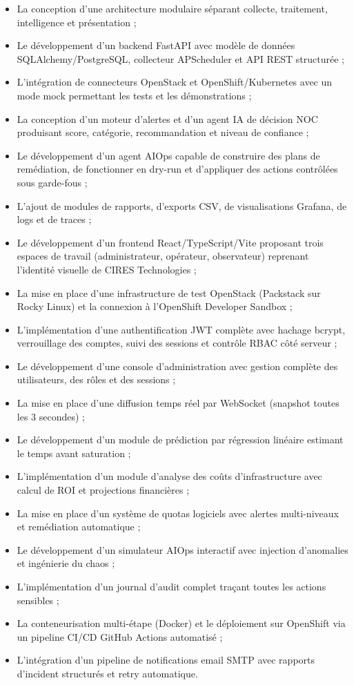 \documentclass[11pt,a4paper]{report}
\begin{document}
\begin{itemize}
  \item La conception d'une architecture modulaire séparant collecte,
    traitement, intelligence et présentation ;
  \item Le développement d'un backend FastAPI avec modèle de données
    SQLAlchemy/PostgreSQL, collecteur APScheduler et API REST structurée ;
  \item L'intégration de connecteurs OpenStack et OpenShift/Kubernetes avec
    un mode mock permettant les tests et les démonstrations ;
  \item La conception d'un moteur d'alertes et d'un agent IA de décision NOC
    produisant score, catégorie, recommandation et niveau de confiance ;
  \item Le développement d'un agent AIOps capable de construire des plans de
    remédiation, de fonctionner en dry-run et d'appliquer des actions
    contrôlées sous garde-fous ;
  \item L'ajout de modules de rapports, d'exports CSV, de visualisations
    Grafana, de logs et de traces ;
  \item Le développement d'un frontend React/TypeScript/Vite proposant trois
    espaces de travail (administrateur, opérateur, observateur) reprenant
    l'identité visuelle de CIRES Technologies ;
  \item La mise en place d'une infrastructure de test OpenStack (Packstack
    sur Rocky Linux) et la connexion à l'OpenShift Developer Sandbox ;
  \item L'implémentation d'une authentification JWT complète avec hachage
    bcrypt, verrouillage des comptes, suivi des sessions et contrôle RBAC
    côté serveur ;
  \item Le développement d'une console d'administration avec gestion
    complète des utilisateurs, des rôles et des sessions ;
  \item La mise en place d'une diffusion temps réel par WebSocket (snapshot
    toutes les 3 secondes) ;
  \item Le développement d'un module de prédiction par régression linéaire
    estimant le temps avant saturation ;
  \item L'implémentation d'un module d'analyse des coûts d'infrastructure
    avec calcul de ROI et projections financières ;
  \item La mise en place d'un système de quotas logiciels avec alertes
    multi-niveaux et remédiation automatique ;
  \item Le développement d'un simulateur AIOps interactif avec injection
    d'anomalies et ingénierie du chaos ;
  \item L'implémentation d'un journal d'audit complet traçant toutes les
    actions sensibles ;
  \item La conteneurisation multi-étape (Docker) et le déploiement sur
    OpenShift via un pipeline CI/CD GitHub Actions automatisé ;
  \item L'intégration d'un pipeline de notifications email SMTP avec rapports
    d'incident structurés et retry automatique.
\end{itemize}
\end{document}
